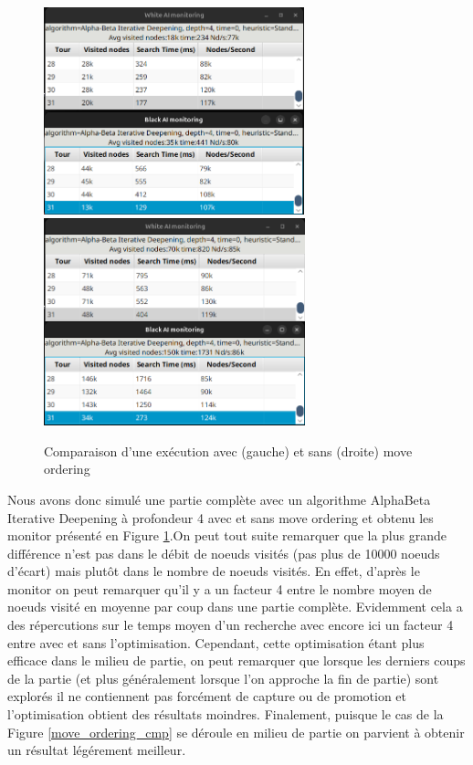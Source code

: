 \documentclass{article}
\begin{document}
\begin{figure}[h]
    \centering
    \includegraphics[width=\textwidth,height=6.0cm,keepaspectratio]{with_mo.png}
    \includegraphics[width=\textwidth,height=6.0cm,keepaspectratio]{without_mo.png}
    \caption{Comparaison d'une exécution avec (gauche) et sans (droite) move ordering}
    \label{move_ordering_cmp_monitor}
\end{figure}
\FloatBarrier

Nous avons donc simulé une partie complète avec un algorithme AlphaBeta Iterative Deepening à profondeur 4 avec et sans move ordering et obtenu les monitor
présenté en Figure \ref{move_ordering_cmp_monitor}.On peut tout suite remarquer que la plus grande différence n'est pas dans le débit de noeuds visités (pas plus de 10000 noeuds d'écart) mais plutôt dans le nombre de noeuds visités.
En effet, d'après le monitor on peut remarquer qu'il y a un facteur 4 entre le nombre moyen de noeuds visité en moyenne par coup dans une partie complète. Evidemment cela a des répercutions
sur le temps moyen d'un recherche avec encore ici un facteur 4 entre avec et sans l'optimisation. Cependant, cette optimisation étant plus efficace dans le milieu de partie, on peut remarquer
que lorsque les derniers coups de la partie (et plus généralement lorsque l'on approche la fin de partie) sont explorés il ne contiennent pas forcément de capture ou de promotion et l'optimisation
obtient des résultats moindres. Finalement, puisque le cas de la Figure \ref{move_ordering_cmp} se déroule en milieu de partie on parvient à obtenir un résultat légérement meilleur.
\end{document}
